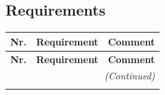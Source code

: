 \subsection{Requirements}

\renewcommand{\arraystretch}{1.3}

\begin{longtable}{|c|p{8cm}|p{4cm}|}
\hline
\textbf{Nr.} & \textbf{Requirement} & \textbf{Comment} \\
\hline
\endfirsthead

\hline
\textbf{Nr.} & \textbf{Requirement} & \textbf{Comment} \\
\hline
\endhead

\hline
\multicolumn{3}{r}{\textit{(Continued)}} \\
\hline
\endfoot

\hline
\endlastfoot


\end{longtable}

